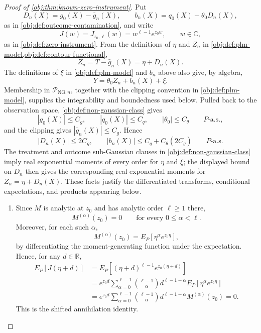 \begin{proof}[Proof of \cref{obj:thm:known-zero-instrument}]
Put
\[
D_n(X)=g_0(X)-\bar g_n(X),\qquad
b_n(X)=q_0(X)-\theta_0D_n(X),
\]
as in \cref{obj:def:outcome-contamination}, and write
\[
J(w)=J_{z_0,\ell}(w)=w^{\ell-1}e^{z_0w},\qquad w\in\mathbb C,
\]
as in \cref{obj:def:zero-instrument}.  From the definitions of \(\eta\) and \(Z_n\) in \cref{obj:def:plm-model,obj:def:contour-functional},
\[
Z_n=T-\bar g_n(X)=\eta+D_n(X).
\]
The definitions of \(\xi\) in \cref{obj:def:plm-model} and \(b_n\) above also give, by algebra,
\[
Y=\theta_0Z_n+b_n(X)+\xi .
\]
Membership in \(\mathcal P_{\mathrm{NG},n}\), together with the clipping convention in \cref{obj:def:plm-model}, supplies the integrability and boundedness used below.  Pulled back to the observation space, \cref{obj:def:non-gaussian-class} gives
\[
|g_0(X)|\le C_g,\qquad |q_0(X)|\le C_q,\qquad |\theta_0|\le C_{\theta}
\qquad P\text{-a.s.},
\]
and the clipping gives \(|\bar g_n(X)|\le C_g\).  Hence
\[
|D_n(X)|\le 2C_g,
\qquad
|b_n(X)|\le C_q+C_{\theta}(2C_g)
\qquad P\text{-a.s.}
\]
The treatment and outcome sub-Gaussian clauses in \cref{obj:def:non-gaussian-class} imply real exponential moments of every order for \(\eta\) and \(\xi\); the displayed bound on \(D_n\) then gives the corresponding real exponential moments for \(Z_n=\eta+D_n(X)\).  These facts justify the differentiated transforms, conditional expectations, and products appearing below.

\begin{enumerate}
\item Since \(M\) is analytic at \(z_0\) and has analytic order \(\ell\ge1\) there,
\[
M^{(\alpha)}(z_0)=0\qquad\text{for every }0\le\alpha<\ell .
\]
Moreover, for each such \(\alpha\),
\[
M^{(\alpha)}(z_0)
=
E_P\!\left[\eta^\alpha e^{z_0\eta}\right],
\]
by differentiating the moment-generating function under the expectation. Hence, for any \(d\in\mathbb R\),
\[
\begin{aligned}
E_P[J(\eta+d)]
&=
E_P\!\left[(\eta+d)^{\ell-1}e^{z_0(\eta+d)}\right]  \\
&=
e^{z_0d}
\sum_{\alpha=0}^{\ell-1}
\binom{\ell-1}{\alpha}d^{\ell-1-\alpha}
E_P\!\left[\eta^\alpha e^{z_0\eta}\right] \\
&=
e^{z_0d}
\sum_{\alpha=0}^{\ell-1}
\binom{\ell-1}{\alpha}d^{\ell-1-\alpha}
M^{(\alpha)}(z_0)
=0 .
\end{aligned}
\]
This is the shifted annihilation identity. %


\end{enumerate}
\end{proof}
